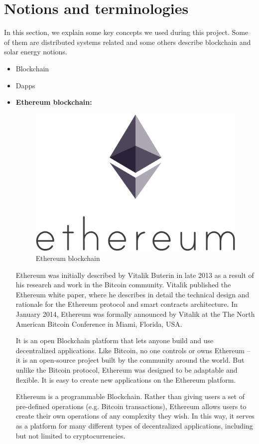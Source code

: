 \section{Notions and terminologies}
    In this section, we explain some key concepts we used during this project. Some of them
    are distributed systems related and some others describe blockchain and solar energy notions.
    \begin{itemize}

        \item Blockchain
        \item Dapps

        \item \textbf{Ethereum blockchain:}

        \begin{figure}[!h]\centering
            \includegraphics[width=.3\columnwidth]{3-State-of-the-art/figs/ethereum.png}
            \caption{Ethereum blockchain}
        \end{figure}
        
        Ethereum\cite{ethereum} was initially described by Vitalik Buterin\cite{v-buterin} in late 2013
        as a result of his research and work in the Bitcoin community. Vitalik published the Ethereum
        white paper, where he describes in detail the technical design and rationale for the Ethereum
        protocol and smart contracts architecture. In January 2014, Ethereum was formally announced by
        Vitalik at the The North American Bitcoin Conference in Miami, Florida, USA.

        It is an open Blockchain platform that lets anyone build and use decentralized
        applications. Like Bitcoin, no one controls or owns Ethereum – it is an open-source project built
        by the community around the world. But unlike the Bitcoin protocol, Ethereum was designed to be
        adaptable and flexible. It is easy to create new applications on the Ethereum platform.
        
        Ethereum is a programmable Blockchain. Rather than giving users a set of pre-defined operations
        (e.g. Bitcoin transactions), Ethereum allows users to create their own operations of any complexity
        they wish. In this way, it serves as a platform for many different types of decentralized applications,
        including but not limited to cryptocurrencies.
        

\end{itemize}
